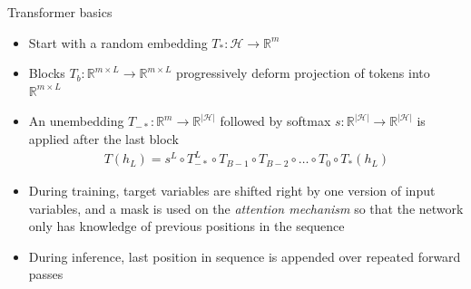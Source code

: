 \begin{frame}{Transformer basics}
\begin{itemize}
    \item Start with a random embedding $T_{*} : \mathcal H \to \mathbb R^m$
    \item Blocks $T_b : \mathbb R^{m \times L} \to \mathbb R^{m \times L}$ progressively deform projection of tokens into $\mathbb R^{m \times L}$
    \item An unembedding $T_{-*}: \mathbb R^m \to \mathbb R^{|\mathcal H|}$ followed by softmax $s : \mathbb R^{|\mathcal H|} \to \mathbb R^{|\mathcal H|}$ is applied after the last block
    \begin{align}
        T(h_L) = s^L \circ T_{-*}^L \circ T_{B-1} \circ T_{B-2} \circ \dotsc \circ T_0 \circ T_* (h_L)
    \end{align}
    \item During training, target variables are shifted right by one version of input variables, and a mask is used on the {\it attention mechanism} so that the network only has knowledge of previous positions in the sequence
    \item During inference, last position in sequence is appended over repeated forward passes
\end{itemize}
\end{frame}

